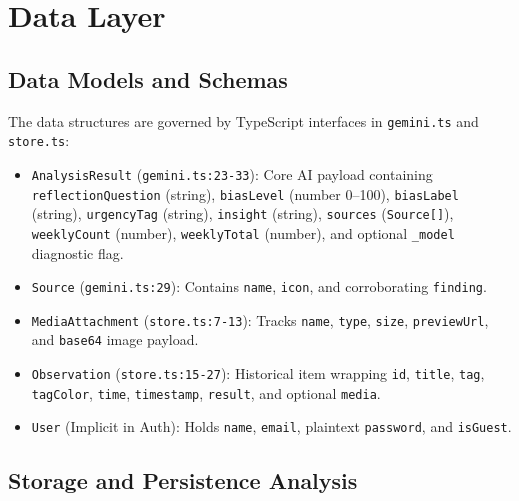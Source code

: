 \documentclass[10pt,a4paper]{report}
\begin{document}
\chapter{Data Layer}

\section{Data Models and Schemas}
The data structures are governed by TypeScript interfaces in \texttt{gemini.ts} and \texttt{store.ts}:
\begin{itemize}[leftmargin=1.5em]
    \item \texttt{AnalysisResult} (\texttt{gemini.ts:23-33}): Core AI payload containing \texttt{reflectionQuestion} (string), \texttt{biasLevel} (number 0--100), \texttt{biasLabel} (string), \texttt{urgencyTag} (string), \texttt{insight} (string), \texttt{sources} (\texttt{Source[]}), \texttt{weeklyCount} (number), \texttt{weeklyTotal} (number), and optional \texttt{\_model} diagnostic flag.
    \item \texttt{Source} (\texttt{gemini.ts:29}): Contains \texttt{name}, \texttt{icon}, and corroborating \texttt{finding}.
    \item \texttt{MediaAttachment} (\texttt{store.ts:7-13}): Tracks \texttt{name}, \texttt{type}, \texttt{size}, \texttt{previewUrl}, and \texttt{base64} image payload.
    \item \texttt{Observation} (\texttt{store.ts:15-27}): Historical item wrapping \texttt{id}, \texttt{title}, \texttt{tag}, \texttt{tagColor}, \texttt{time}, \texttt{timestamp}, \texttt{result}, and optional \texttt{media}.
    \item \texttt{User} (Implicit in Auth): Holds \texttt{name}, \texttt{email}, plaintext \texttt{password}, and \texttt{isGuest}.
\end{itemize}

\section{Storage and Persistence Analysis}
\end{document}
